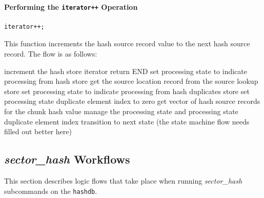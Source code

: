 \documentclass[10pt,twoside]{article}
\newcommand{\sh}{\emph{sector\_hash}\xspace}
\newcommand{\hdb}{\texttt{hashdb}\xspace}
\begin{document}
\paragraph{Performing the \texttt{iterator++} Operation}
\begin{small}
\begin{verbatim}
iterator++;
\end{verbatim}
\end{small}
This function increments the hash source record value to the next hash source record.
The flow is as follows:

\begin{algorithmic}
  \STATE increment the hash store iterator
    \STATE return END
  \ELSE
      \STATE set processing state to indicate processing from hash store
      \STATE get the source location record from the source lookup store
    \ELSE
      \STATE set processing state to indicate processing from hash duplicates store
      \STATE set processing state duplicate element index to zero
      \STATE get vector of hash source records for the chunk hash value
    \ENDIF
  \ENDIF
\ELSE
  \STATE manage the processing state and processing state duplicate element index
  \STATE transition to next state (the state machine flow needs filled out better here)
\ENDIF
\end{algorithmic}

\subsection{\sh Workflows}
This section describes logic flows that take place
when running \sh subcommands on the \hdb.

\end{document}
